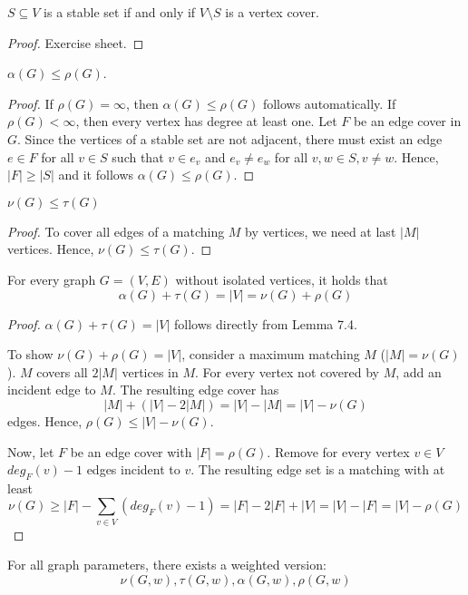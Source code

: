 \begin{lem} %
$S \subseteq V$ is a stable set if and only if $V \setminus S$ is a vertex
cover.
\end{lem}
\begin{proof}
Exercise sheet.
\end{proof}

\begin{lem} %
$\alpha(G) \leq \rho(G)$.
\end{lem}
\begin{proof}
If $\rho(G) = \infty$, then $\alpha(G) \leq \rho(G)$ follows automatically.
If $\rho(G) < \infty$, then every vertex has degree at least one. Let $F$ be
an edge cover in $G$. Since the vertices of a stable set are not adjacent,
there must exist an edge $e \in F$ for all $v \in S$ such that $v \in e_v$
and $e_v \neq e_w$ for all $v, w \in S, v \neq w$. Hence, $|F| \geq |S|$ and
it follows $\alpha(G) \leq \rho(G)$.
\end{proof}

\begin{lem} %
$\nu(G) \leq \tau(G)$
\end{lem}
\begin{proof}
To cover all edges of a matching $M$ by vertices, we need at last $|M|$
vertices. Hence, $\nu(G) \leq \tau(G)$.
\end{proof}
\begin{thm}

For every graph $G = (V, E)$ without isolated vertices, it holds that
\[
\alpha(G) + \tau(G) = |V| = \nu(G) + \rho(G)
\]
\end{thm}
\begin{proof}
$\alpha(G) + \tau(G) = |V|$ follows directly from Lemma 7.4.

To show $\nu(G) + \rho(G) = |V|$, consider a maximum matching $M$ ($|M| =
\nu(G)$). $M$ covers all $2 |M|$ vertices in $M$. For every vertex not
covered by $M$, add an incident edge to $M$. The resulting edge cover has
\[
|M| + (|V| - 2 |M|) = |V| - |M| = |V| - \nu(G)
\] edges. Hence, $\rho(G) \leq
|V| - \nu(G)$.

Now, let $F$ be an edge cover with $|F| = \rho(G)$. Remove for every vertex
$v \in V$ $deg_F(v) - 1$ edges incident to $v$. The resulting edge set is a
matching with at least
\[
\nu(G) \geq |F| - \sum\limits_{v \in V} (deg_F(v) - 1) = |F| - 2 |F| + |V| = |V| - |F|
= |V| - \rho(G)
\]
\end{proof}

For all graph parameters, there exists a weighted version:
\[
\nu(G, w), \tau(G, w), \alpha(G, w), \rho(G, w)
\]

